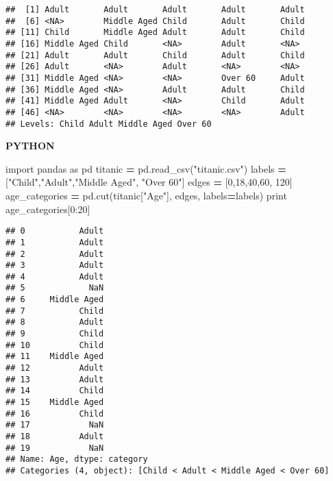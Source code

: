 \documentclass[12pt,]{book}
\newenvironment{Shaded}{\begin{snugshade}}{\end{snugshade}}
\newcommand{\DecValTok}[1]{\textcolor[rgb]{0.00,0.00,0.81}{#1}}
\newcommand{\StringTok}[1]{\textcolor[rgb]{0.31,0.60,0.02}{#1}}
\newcommand{\ImportTok}[1]{#1}
\newcommand{\OperatorTok}[1]{\textcolor[rgb]{0.81,0.36,0.00}{\textbf{#1}}}
\newcommand{\BuiltInTok}[1]{#1}
\newcommand{\NormalTok}[1]{#1}
\theoremstyle{definition}
\theoremstyle{definition}
\theoremstyle{definition}
\theoremstyle{remark}
\begin{document}
\begin{verbatim}
##  [1] Adult       Adult       Adult       Adult       Adult      
##  [6] <NA>        Middle Aged Child       Adult       Child      
## [11] Child       Middle Aged Adult       Adult       Child      
## [16] Middle Aged Child       <NA>        Adult       <NA>       
## [21] Adult       Adult       Child       Adult       Child      
## [26] Adult       <NA>        Adult       <NA>        <NA>       
## [31] Middle Aged <NA>        <NA>        Over 60     Adult      
## [36] Middle Aged <NA>        Adult       Adult       Child      
## [41] Middle Aged Adult       <NA>        Child       Adult      
## [46] <NA>        <NA>        <NA>        <NA>        Adult      
## Levels: Child Adult Middle Aged Over 60
\end{verbatim}

\textbf{PYTHON}

\begin{Shaded}
\begin{Highlighting}[]
\ImportTok{import}\NormalTok{ pandas }\ImportTok{as}\NormalTok{ pd}
\NormalTok{titanic }\OperatorTok{=}\NormalTok{ pd.read_csv(}\StringTok{"titanic.csv"}\NormalTok{)}
\NormalTok{labels }\OperatorTok{=}\NormalTok{ [}\StringTok{"Child"}\NormalTok{,}\StringTok{"Adult"}\NormalTok{,}\StringTok{"Middle Aged"}\NormalTok{, }\StringTok{"Over 60"}\NormalTok{]}
\NormalTok{edges }\OperatorTok{=}\NormalTok{ [}\DecValTok{0}\NormalTok{,}\DecValTok{18}\NormalTok{,}\DecValTok{40}\NormalTok{,}\DecValTok{60}\NormalTok{, }\DecValTok{120}\NormalTok{]}
\NormalTok{age_categories }\OperatorTok{=}\NormalTok{  pd.cut(titanic[}\StringTok{"Age"}\NormalTok{], edges, labels}\OperatorTok{=}\NormalTok{labels)}
\BuiltInTok{print}\NormalTok{ age_categories[}\DecValTok{0}\NormalTok{:}\DecValTok{20}\NormalTok{]}
\end{Highlighting}
\end{Shaded}

\begin{verbatim}
## 0           Adult
## 1           Adult
## 2           Adult
## 3           Adult
## 4           Adult
## 5             NaN
## 6     Middle Aged
## 7           Child
## 8           Adult
## 9           Child
## 10          Child
## 11    Middle Aged
## 12          Adult
## 13          Adult
## 14          Child
## 15    Middle Aged
## 16          Child
## 17            NaN
## 18          Adult
## 19            NaN
## Name: Age, dtype: category
## Categories (4, object): [Child < Adult < Middle Aged < Over 60]
\end{verbatim}
\end{document}
